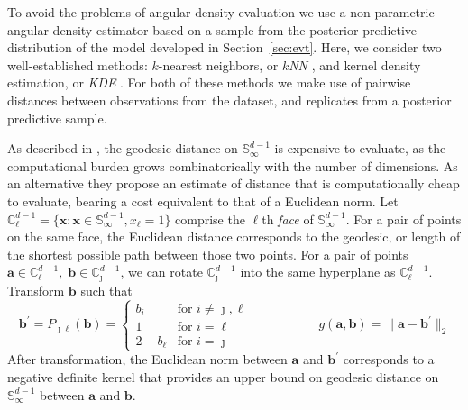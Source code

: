 To avoid the problems of angular density evaluation we use a 
    non-parametric angular density estimator based on a sample from the 
    posterior predictive distribution of the model developed in 
    Section~\ref{sec:evt}. Here, we consider two well-established
    methods: $k$-nearest neighbors, or \emph{$k$NN} \citep{mack1979}, and 
    kernel density estimation, or \emph{KDE} \citep{parzen1962}.  For both of 
    these methods we make use of pairwise distances between observations 
    from the dataset, and replicates from a posterior predictive sample.  

As described in \cite{trubey:pg}, the  geodesic distance on 
    $\mathbb{S}_{\infty}^{d-1}$ 
    is expensive to evaluate, as the computational burden grows 
    combinatorically with the number of dimensions.  As an alternative they propose an 
    estimate of distance that is computationally cheap to evaluate, bearing 
    a cost equivalent to that of a Euclidean norm.
    Let
    ${\mathbb C}_{\ell}^{d-1} = \lbrace \bm{x} : 
        \bm{x} \in {\mathbb S}_{\infty}^{d-1}, x_{\ell} = 1\rbrace$
    comprise the $\ell$th \emph{face} of $\mathbb{S}_{\infty}^{d-1}$.  For a 
    pair of points on the same face, the Euclidean distance corresponds to the
    geodesic, or length of the shortest possible path between those two points.  
    For a pair of points 
    $\bm{a} \in \mathbb{C}_{\ell}^{d-1},\;\bm{b}\in\mathbb{C}_{\jmath}^{d-1}$,
    we can rotate $\mathbb{C}_{\jmath}^{d-1}$ into the same hyperplane as 
    $\mathbb{C}_{\ell}^{d-1}$.  Transform $\bm{b}$ such that %
    \begin{equation}
        \label{eqn:rotation}
        \bm{b}^{\prime} = P_{\jmath\ell}(\bm{b}) = 
        \begin{cases}
            b_{i} &\text{for }i\neq \jmath,\ell\\
            1 &\text{for }i = \ell\\
            2 - b_{\ell} &\text{for }i = \jmath
        \end{cases}\;\hspace{2cm}\;
        g(\bm{a},\bm{b}) = \lVert \bm{a} - \bm{b}^{\prime}\rVert_2
    \end{equation}
    After transformation, the Euclidean norm between $\bm{a}$ and 
    $\bm{b}^{\prime}$ corresponds to a negative definite kernel that
    provides an upper bound on geodesic distance on 
    $\mathbb{S}_{\infty}^{d-1}$ between $\bm{a}$ and $\bm{b}$.

